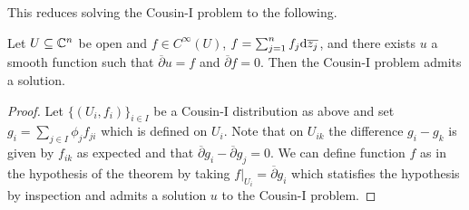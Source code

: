 This reduces solving the Cousin-I problem to the following. 
\begin{proposition}\label{prop: Cousin-I is CR01}
    Let $U\subseteq\mathbb{C}^{n}$ be open and $f\in C^{\infty}(U)$, $f=\sum_{j=1}^{n}f_{j}\mathrm{d}\overline{z_{j}}$, and there exists $u$ a smooth function such that $\overline{\partial}u=f$ and $\overline{\partial}f=0$. Then the Cousin-I problem admits a solution. 
\end{proposition}
\begin{proof}
    Let $\{(U_{i},f_{i})\}_{i\in I}$ be a Cousin-I distribution as above and set $g_{i}=\sum_{j\in I}\phi_{j}f_{ji}$ which is defined on $U_{i}$. Note that on $U_{ik}$ the difference $g_{i}-g_{k}$ is given by $f_{ik}$ as expected and that $\overline{\partial}g_{i}-\overline{\partial}g_{j}=0$. We can define function $f$ as in the hypothesis of the theorem by taking $f|_{U_{i}}=\overline{\partial}g_{i}$ which statisfies the hypothesis by inspection and admits a solution $u$ to the Cousin-I problem. 
\end{proof}